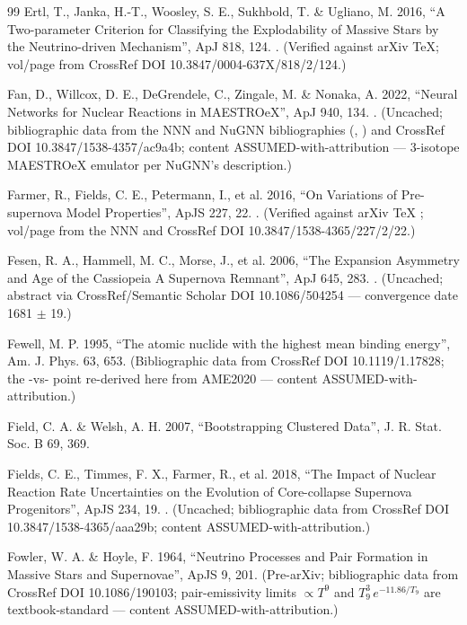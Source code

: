 \begin{thebibliography}{99}
Ertl, T., Janka, H.-T., Woosley, S. E., Sukhbold, T. \& Ugliano, M. 2016, ``A Two-parameter Criterion for Classifying the Explodability of Massive Stars by the Neutrino-driven Mechanism'', ApJ 818, 124. . (Verified against arXiv TeX; vol/page from CrossRef DOI 10.3847/0004-637X/818/2/124.)

Fan, D., Willcox, D. E., DeGrendele, C., Zingale, M. \& Nonaka, A. 2022, ``Neural Networks for Nuclear Reactions in MAESTROeX'', ApJ 940, 134. . (Uncached; bibliographic data from the NNN and NuGNN bibliographies (, ) and CrossRef DOI 10.3847/1538-4357/ac9a4b; content ASSUMED-with-attribution --- 3-isotope MAESTROeX emulator per NuGNN's description.)

Farmer, R., Fields, C. E., Petermann, I., et al. 2016, ``On Variations of Pre-supernova Model Properties'', ApJS 227, 22. . (Verified against arXiv TeX ; vol/page from the NNN  and CrossRef DOI 10.3847/1538-4365/227/2/22.)

Fesen, R. A., Hammell, M. C., Morse, J., et al. 2006, ``The Expansion Asymmetry and Age of the Cassiopeia A Supernova Remnant'', ApJ 645, 283. . (Uncached; abstract via CrossRef/Semantic Scholar DOI 10.1086/504254 --- convergence date 1681 $\pm$ 19.)

Fewell, M. P. 1995, ``The atomic nuclide with the highest mean binding energy'', Am. J. Phys. 63, 653. (Bibliographic data from CrossRef DOI 10.1119/1.17828; the -vs- point re-derived here from AME2020 --- content ASSUMED-with-attribution.)

Field, C. A. \& Welsh, A. H. 2007, ``Bootstrapping Clustered Data'', J. R. Stat. Soc. B 69, 369.

Fields, C. E., Timmes, F. X., Farmer, R., et al. 2018, ``The Impact of Nuclear Reaction Rate Uncertainties on the Evolution of Core-collapse Supernova Progenitors'', ApJS 234, 19. . (Uncached; bibliographic data from CrossRef DOI 10.3847/1538-4365/aaa29b; content ASSUMED-with-attribution.)

Fowler, W. A. \& Hoyle, F. 1964, ``Neutrino Processes and Pair Formation in Massive Stars and Supernovae'', ApJS 9, 201. (Pre-arXiv; bibliographic data from CrossRef DOI 10.1086/190103; pair-emissivity limits $\propto T^9$ and $T_9^3\,e^{-11.86/T_9}$ are textbook-standard --- content ASSUMED-with-attribution.)


\end{thebibliography}
